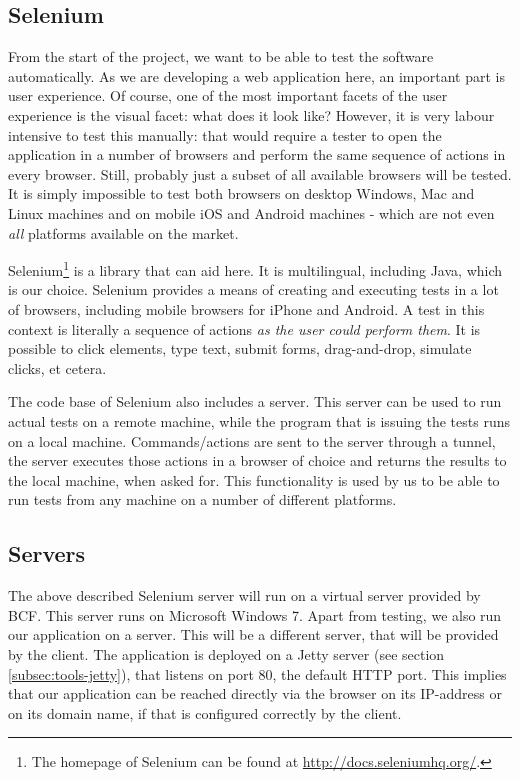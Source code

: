 \subsection{Selenium}
\label{subsec:tools-selenium}
From the start of the project, we want to be able to test the software automatically. As we are developing a web application here, an important part is user experience. Of course, one of the most important facets of the user experience is the visual facet: what does it look like? However, it is very labour intensive to test this manually: that would require a tester to open the application in a number of browsers and perform the same sequence of actions in every browser. Still, probably just a subset of all available browsers will be tested. It is simply impossible to test both browsers on desktop Windows, Mac and Linux machines and on mobile iOS and Android machines - which are not even \emph{all} platforms available on the market.

Selenium\footnote{The homepage of Selenium can be found at \url{http://docs.seleniumhq.org/}.} is a library that can aid here. It is multilingual, including Java, which is our choice. Selenium provides a means of creating and executing tests in a lot of browsers, including mobile browsers for iPhone and Android. A test in this context is literally a sequence of actions \emph{as the user could perform them}. It is possible to click elements, type text, submit forms, drag-and-drop, simulate clicks, et cetera.

The code base of Selenium also includes a server. This server can be used to run actual tests on a remote machine, while the program that is issuing the tests runs on a local machine. Commands/actions are sent to the server through a tunnel, the server executes those actions in a browser of choice and returns the results to the local machine, when asked for. This functionality is used by us to be able to run tests from any machine on a number of different platforms.

\subsection{Servers}
\label{subsec:tools-server}
The above described Selenium server will run on a virtual server provided by BCF. This server runs on Microsoft Windows 7. Apart from testing, we also run our application on a server. This will be a different server, that will be provided by the client. The application is deployed on a Jetty server (see section \ref{subsec:tools-jetty}), that listens on port 80, the default HTTP port. This implies that our application can be reached directly via the browser on its IP-address or on its domain name, if that is configured correctly by the client.


